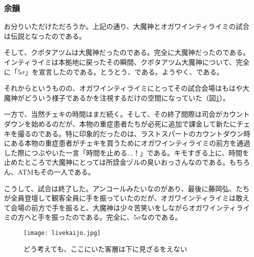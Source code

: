 \subsubsection{余韻}
お分りいただけただろうか。上記の通り、大魔神とオガワインティライミの試合は伝説となったのである。\par
そして、クボタアツムは大魔神だったのである。完全に大魔神だったのである。インティライミは本拠地に戻ったその瞬間、クボタアツム大魔神について、完全に「$5\sigma$」を宣言したのである。とうとう、である。ようやく、である。\par
それからというものの、オガワインティライミにとってその試合会場はもはや大魔神がどういう様子であるかを注視するだけの空間になっていた（図\ref{livekaijo}）。\par
一方で、当然チェキの時間はまだ続く。そして、その終了間際は司会がカウントダウンを始めるのだが、本物の重症患者たちが必死に追加で課金して新たにチェキを撮るのである。特に印象的だったのは、ラストスパートのカウントダウン時にある本物の重症患者がチェキを買うためにオガワインティライミの前方を通過した際につぶやいた一言「時間を止める...！」である。キモすぎる上に、時間を止めたところで大魔神にとっては所詮金ヅルの臭いおっさんなのである。もちろん、ATMもその一人である。\par
こうして、試合は終了した。アンコールみたいなのがあり、最後に藤岡弘、たちが全員登壇して観客全員に手を振っていたのだが、オガワインティライミは敢えて会場の前方で手を振ると、大魔神は少々苦笑いをしながらオガワインティライミの方へと手を振ったのである。完全に、$5\sigma$なのである。\par

\begin{figure}[H]
\centering
\texttt{[image: livekaijo.jpg]}
    \caption{どう考えても、ここにいた客層は下に見ざるをえない}
    \label{livekaijo}
\end{figure}




